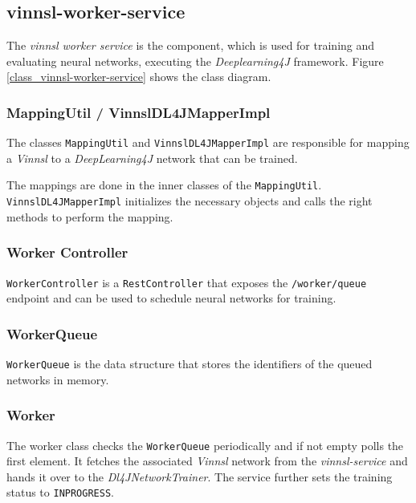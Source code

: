 \subsection{vinnsl-worker-service}\label{vinnsl-worker-service}

The \emph{vinnsl worker service} is the component, which is used for
training and evaluating neural networks, executing the
\emph{Deeplearning4J} framework. Figure
\ref{class_vinnsl-worker-service} shows the class diagram.

\subsubsection{MappingUtil /
VinnslDL4JMapperImpl}\label{mappingutil-vinnsldl4jmapperimpl}

The classes \texttt{MappingUtil} and \texttt{VinnslDL4JMapperImpl} are
responsible for mapping a \emph{Vinnsl} to a \emph{DeepLearning4J}
network that can be trained.

The mappings are done in the inner classes of the \texttt{MappingUtil}.
\texttt{VinnslDL4JMapperImpl} initializes the necessary objects and
calls the right methods to perform the mapping.

\subsubsection{Worker Controller}\label{worker-controller}

\texttt{WorkerController} is a \texttt{RestController} that exposes the
\texttt{/worker/queue} endpoint and can be used to schedule neural
networks for training.

\subsubsection{WorkerQueue}\label{workerqueue}

\texttt{WorkerQueue} is the data structure that stores the identifiers
of the queued networks in memory.

\subsubsection{Worker}\label{worker}

The worker class checks the \texttt{WorkerQueue} periodically and if not
empty polls the first element. It fetches the associated \emph{Vinnsl}
network from the \emph{vinnsl-service} and hands it over to the
\emph{Dl4JNetworkTrainer}. The service further sets the training status
to \texttt{INPROGRESS}.

